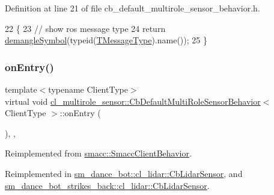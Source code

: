 Definition at line 21 of file cb\+\_\+default\+\_\+multirole\+\_\+sensor\+\_\+behavior.\+h.


\begin{DoxyCode}
22   \{
23     \textcolor{comment}{// show ros message type}
24     \textcolor{keywordflow}{return} \hyperlink{namespacesmacc_1_1introspection_a2f495108db3e57604d8d3ff5ef030302}{demangleSymbol}(\textcolor{keyword}{typeid}(\hyperlink{classcl__multirole__sensor_1_1CbDefaultMultiRoleSensorBehavior_aa23bc8c99de1eddad01d094bdab62aa4}{TMessageType}).name());
25   \}
\end{DoxyCode}
\mbox{\label{classcl__multirole__sensor_1_1CbDefaultMultiRoleSensorBehavior_a5ac29f93cc91e23715f51ade94467cae}} 
\subsubsection{\texorpdfstring{on\+Entry()}{onEntry()}}
{\footnotesize\ttfamily template$<$typename Client\+Type$>$ \\
virtual void \hyperlink{classcl__multirole__sensor_1_1CbDefaultMultiRoleSensorBehavior}{cl\+\_\+multirole\+\_\+sensor\+::\+Cb\+Default\+Multi\+Role\+Sensor\+Behavior}$<$ Client\+Type $>$\+::on\+Entry (\begin{DoxyParamCaption}{ }\end{DoxyParamCaption})\hspace{0.3cm}{\ttfamily [inline]}, {\ttfamily [override]}, {\ttfamily [virtual]}}



Reimplemented from \hyperlink{classsmacc_1_1SmaccClientBehavior_a7962382f93987c720ad432fef55b123f}{smacc\+::\+Smacc\+Client\+Behavior}.



Reimplemented in \hyperlink{structsm__dance__bot_1_1cl__lidar_1_1CbLidarSensor_aad3468a6ae78999c9fd01bdb81b42a49}{sm\+\_\+dance\+\_\+bot\+::cl\+\_\+lidar\+::\+Cb\+Lidar\+Sensor}, and \hyperlink{structsm__dance__bot__strikes__back_1_1cl__lidar_1_1CbLidarSensor_a82d0250dcf2d4e9b12ccd528a5d87002}{sm\+\_\+dance\+\_\+bot\+\_\+strikes\+\_\+back\+::cl\+\_\+lidar\+::\+Cb\+Lidar\+Sensor}.



